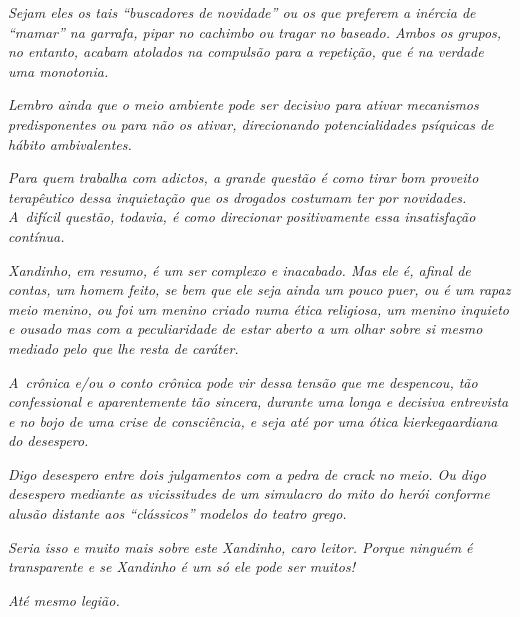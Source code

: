 \emph{Sejam eles os tais ``buscadores de novidade'' ou os que preferem a
inércia de ``mamar'' na garrafa, pipar no cachimbo ou tragar no baseado.
Ambos os grupos, no entanto, acabam atolados na compulsão para a
repetição, que é na verdade uma monotonia.}

\emph{Lembro ainda que o meio ambiente pode ser decisivo para ativar
mecanismos predisponentes ou para não os ativar, direcionando
potencialidades psíquicas de hábito ambivalentes.}

\emph{Para quem trabalha com adictos, a grande questão é como tirar bom
proveito terapêutico dessa inquietação que os drogados costumam ter por
novidades. A~difícil questão, todavia, é como direcionar positivamente
essa insatisfação contínua.}

\emph{Xandinho, em resumo, é um ser complexo e inacabado. Mas ele é,
afinal de contas, um homem feito, se bem que ele seja ainda um pouco
puer, ou é um rapaz meio menino, ou foi um menino criado numa ética
religiosa, um menino inquieto e ousado mas com a peculiaridade de estar
aberto a um olhar sobre si mesmo mediado pelo que lhe resta de
caráter.}

\emph{A~crônica e/ou o conto crônica pode vir dessa tensão que me
despencou, tão confessional e aparentemente tão sincera, durante uma
longa e decisiva entrevista e no bojo de uma crise de consciência, e
seja até por uma ótica kierkegaardiana do desespero.}

\emph{Digo desespero entre dois julgamentos com a pedra de crack no
meio. Ou digo desespero mediante as vicissitudes de um simulacro do mito
do herói conforme alusão distante aos ``clássicos'' modelos do teatro
grego.}

\emph{Seria isso e muito mais sobre este Xandinho, caro leitor. Porque
ninguém é transparente e se Xandinho é um só ele pode ser muitos!}

\emph{Até mesmo legião.~}

 

 

 
